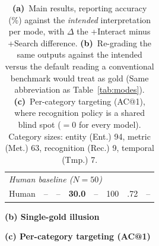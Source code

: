 \begin{table}[t]
\begin{minipage}[t]{0.53\textwidth}
{{\begin{tabular}{lccccccc}
\midrule
\multicolumn{8}{l}{\textit{Human baseline ($N{=}50$)}} \\
Human             & -- & -- & \textbf{30.0} & -- & 100 & .72 & -- \\
\bottomrule
\end{tabular}}}
\end{minipage}\hspace{\midgap}%
\begin{minipage}[t]{0.4\textwidth}
\centering
\textbf{(b) Single-gold illusion}\par\smallskip
{\small
{}}
\par\bigskip
\textbf{(c) Per-category targeting (AC@1)}\par\smallskip
{\small
{}}
\end{minipage}
\caption{\textbf{(a)}~Main results, reporting accuracy (\%) against the \emph{intended}
interpretation per mode, with $\Delta$ the +Interact minus +Search difference.
\textbf{(b)}~Re-grading the same outputs against the intended versus the default reading a conventional benchmark would treat as gold (Same abbreviation as Table~\ref{tab:modes}). \textbf{(c)}~Per-category targeting
(AC@1), where recognition policy is a shared blind spot ($=0$ for every model). Category
sizes: entity (Ent.) 94, metric (Met.) 63, recognition (Rec.) 9, temporal (Tmp.) 7.}
\label{tab:main}
\end{table}
